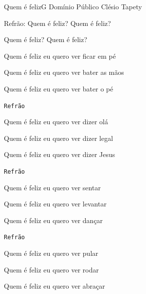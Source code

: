 \documentclass[a4,12pt,oneside]{book}
\newcommand{\RevDate}{\today}
\newcommand{\NotCCLIed}{\relax}
\renewcommand{\SBPubDom}{Domínio Público}
\begin{document}
\begin{song}{Quem é feliz}{G}
  {\SBPubDom}
  {Clésio Tapety}
  {}
  {\NotCCLIed}
  
	\renewcommand{\RevDate}{11 de setembro de 2014}
 
	
	\ifChordBk	
	\vspace{-2em}\flushright{\Gchord \quad \Cchord}
	
	\vspace{-1ex}
	\fi
	
	
	\begin{SBBracket}{Refrão:}
		Quem é feliz? Quem é feliz?

		Quem é feliz? Quem é feliz?		
	\end{SBBracket}
	
	\begin{SBVerse*}
		Quem é feliz eu quero ver ficar em pé
		
		Quem é feliz eu quero ver bater as mãos
		
		Quem é feliz eu quero ver bater o pé
	\end{SBVerse*}
	
	
	\begin{SBVerse*}
		\small\texttt{Refrão}
	\end{SBVerse*}
	
	\ifChordBk
	\vspace{-4ex}
	\fi
	
	\begin{SBVerse*}
		Quem é feliz eu quero ver dizer olá
			
		Quem é feliz eu quero ver dizer legal
			
		Quem é feliz eu quero ver dizer Jesus
	\end{SBVerse*}
	
	\begin{SBVerse*}
		\small\texttt{Refrão}
	\end{SBVerse*}

	\ifChordBk
	\vspace{-4ex}
	\fi
		
	\begin{SBVerse*}
		Quem é feliz eu quero ver sentar
			
		Quem é feliz eu quero ver levantar
			
		Quem é feliz eu quero ver dançar
	\end{SBVerse*}

	
	\begin{SBVerse*}
		\small\texttt{Refrão}
	\end{SBVerse*}
	
	\ifChordBk
	\vspace{-4ex}
	\fi
		
	\begin{SBVerse*}
		Quem é feliz eu quero ver pular
			
		Quem é feliz eu quero ver rodar
			
		Quem é feliz eu quero ver abraçar
	\end{SBVerse*}
\end{song}
\end{document}
